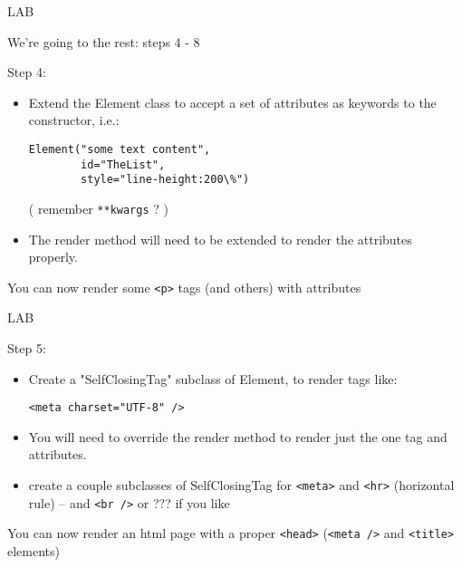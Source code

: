 \documentclass{beamer}
\begin{document}
\begin{frame}[fragile]{LAB}

{\Large We're going to the rest: steps 4 - 8}

\vfill
{\Large Step 4:}

\begin{itemize}
  \item Extend the Element class to accept a set of attributes as keywords to the
  constructor, i.e.:
  \begin{verbatim}
Element("some text content",
        id="TheList",
        style="line-height:200\%")
  \end{verbatim}
    ( remember \verb|**kwargs| ? )
  \item The render method will need to be extended to render the attributes properly.
\end{itemize}

\vfill
You can now render some \verb|<p>| tags (and others) with attributes  
\end{frame}

\begin{frame}[fragile]{LAB}

{\Large Step 5:}

\begin{itemize}
   \item Create a "SelfClosingTag" subclass of Element, to render tags like:
   
   \verb|<meta charset="UTF-8" />|
   
   \item You will need to override the render method to render just the one tag and
   attributes.
   
   \item create a couple subclasses of SelfClosingTag for \verb|<meta>| and \verb|<hr>|
   (horizontal rule) -- and \verb|<br />| or ??? if you like
   \end{itemize}

\vfill
You can now render an html page with a proper \verb|<head>| (\verb|<meta />| and \verb|<title>| elements)
\end{frame}
\end{document}
